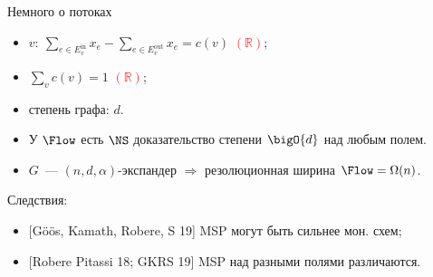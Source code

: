 \begin{frame}{Немного о потоках}
    \begin{minipage}{0.5 \linewidth}
        
    \end{minipage}%
    \begin{minipage}{0.5 \linewidth}
        \pause
        \pause
        \begin{itemize}
            \item $v\colon ~ \sum\limits_{e \in E^{\mathrm{in}}_v} x_{e} - \sum\limits_{e \in E^{\mathrm{out}}_v} x_{e} = c(v)$
                \textcolor{red}{$(\mathbb{R})$};
            \item $\sum\limits_{v} c(v) = 1$ \textcolor{red}{$(\mathbb{R})$};
            \item степень графа: $d$.
        \end{itemize}
    \end{minipage}

    \pause
    \vspace{0.2cm}
    \begin{itemize}
        \item У $\Flow$ есть $\NS$ доказательство степени $\bigO{d}$ над любым полем.
        \item $G$~--- $(n, d, \alpha)$-экспандер $\Rightarrow$ резолюционная ширина $\Flow = \Omega(n)$.
    \end{itemize}
    
    Следствия:
    \begin{itemize}
        \item{} [G\"{o}\"{o}s, Kamath, Robere, S 19] MSP могут быть сильнее мон. схем;
        \item{} [Robere Pitassi 18; GKRS 19] MSP над разными полями различаются.
    \end{itemize}

\end{frame}


